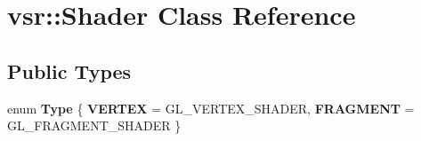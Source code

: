 \hypertarget{classvsr_1_1_shader}{\section{vsr\-:\-:Shader Class Reference}
\label{classvsr_1_1_shader}
}
\subsection*{Public Types}
\begin{DoxyCompactItemize}
\item 
enum {\bfseries Type} \{ {\bfseries V\-E\-R\-T\-E\-X} =  G\-L\-\_\-\-V\-E\-R\-T\-E\-X\-\_\-\-S\-H\-A\-D\-E\-R, 
{\bfseries F\-R\-A\-G\-M\-E\-N\-T} =  G\-L\-\_\-\-F\-R\-A\-G\-M\-E\-N\-T\-\_\-\-S\-H\-A\-D\-E\-R
 \}
\end{DoxyCompactItemize}
